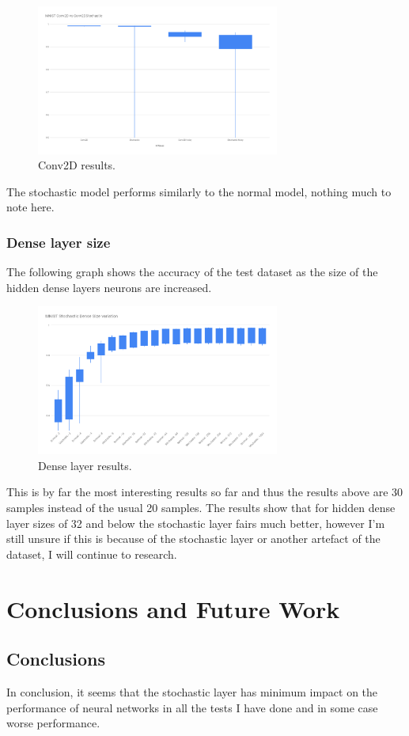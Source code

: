 \documentclass[a4paper,oneside,phd,etd]{BYUPhys}
\begin{document}
\begin{figure}[H]
\centering
\includegraphics[width=8cm]{results/conv2d.png}
\caption{Conv2D results.}
\label{fig:conv2d}
\end{figure}
The stochastic model performs similarly to the normal model, nothing much to note here.

\subsection{Dense layer size}
The following graph shows the accuracy of the test dataset as the size of the hidden dense layers neurons are increased.
\begin{figure}[H]
\centering
\includegraphics[width=8cm]{results/dense_layer.png}
\caption{Dense layer results.}
\label{fig:denselayer}
\end{figure}

This is by far the most interesting results so far and thus the results above are 30 samples instead of the usual 20 samples. The results show that for hidden dense layer sizes of 32 and below the stochastic layer fairs much better, however I'm still unsure if this is because of the stochastic layer or another artefact of the dataset, I will continue to research.

\chapter{Conclusions and Future Work}
\label{chap:Conclusions}

\section{Conclusions}
\label{sec:ConclusionsConclusions}
In conclusion, it seems that the stochastic layer has minimum impact on the performance of neural networks in all the tests I have done and in some case worse performance. 
\end{document}
